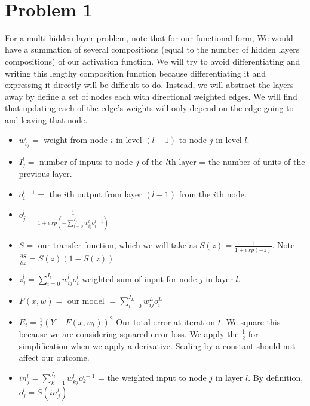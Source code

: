 \documentclass[11pt]{article}
\begin{document}
\begin{center}

\ \\
\end{center}

\section*{Problem 1}

\vspace{5 mm}
\noindent
For a multi-hidden layer problem, note that for our functional form, We would 
have a summation of several compositions (equal to the number of hidden layers 
compositions) of our activation function. We will try to avoid differentiating 
and writing this lengthy composition function because differentiating it and 
expressing it directly will be difficult to do. Instead, we will abstract the 
layers away by define a set of nodes each with directional weighted edges. We 
will find that updating each of the edge's weights will only depend on the 
edge going to and leaving that node. 

\begin{itemize}
\item $w_{ij}^{l} = $ weight from node $i$ in level $(l - 1)$ to node $j$ in 
level $l$.
\item $I_{j}^{l} = $ number of inputs to node $j$ of the $l$th layer = 
the number of units of the previous layer.
\item $o_{i}^{l - 1} = $ the $i$th output from layer $(l -1)$ from the $i$th 
node.
\item $o_{j}^{l} = \frac{1}{1 + exp(-\sum_{i = 0}^{I_{j}^{l}} 
w_{ij}^{l} o_{i}^{l - 1})}$
\item $S = $ our transfer function, which we will take as $S(z) = 
\frac{1}{1 + exp(-z)}$. Note $\frac{\partial S}{\partial z} = S(z)(1 - S(z))$
\item $z_{j}^{l} = \sum_{i = 0}^{I_{l}} w_{ij}^{l} o_{i}^{l}$ weighted sum of 
input for node $j$ in layer $l$.
\item $F(x, w) = $ our model $ = \sum_{i = 0}^{I_{L}} w_{ij}^{L} o_{i}^{L}$
\item $E_{t} = \frac{1}{2}(Y - F(x, w_{t}))^{2} $ Our total error at iteration 
$t$. We square this because we are considering squared error loss. We apply the 
$\frac{1}{2}$ for simplification when we apply a derivative. Scaling by a 
constant should not affect our outcome.
\item $in_{j}^{l} = \sum_{k = 1}^{I_{l}} w_{kj}^{l} o_{k}^{l - 1} $ = the 
weighted input to node $j$ in layer $l$. By definition, 
$o_{j}^{l} = S(in_{j}^{l})$
\end{itemize}
\end{document}
